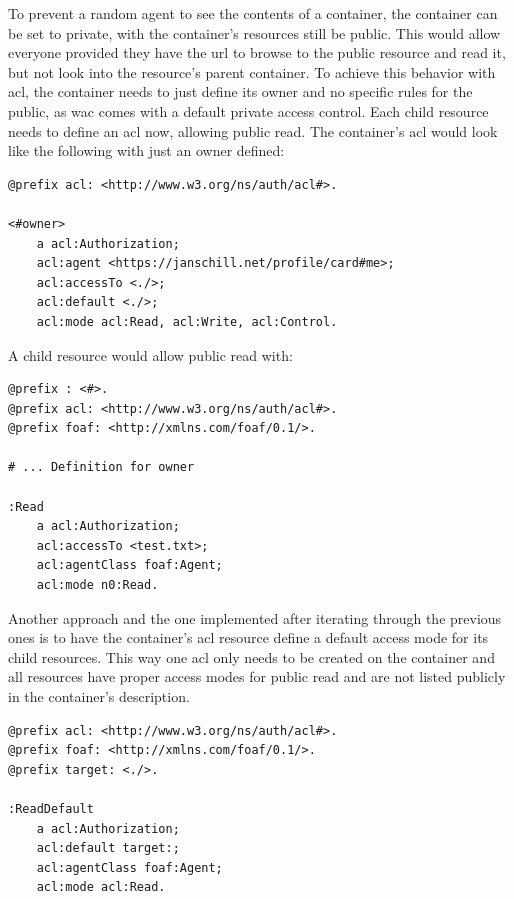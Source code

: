 To prevent a random agent to see the contents of a container, the container can be set to private, with the container’s resources still be public. This would allow everyone provided they have the \gls{url} to browse to the public resource and read it, but not look into the resource’s parent container. To achieve this behavior with \gls{acl}, the container needs to just define its owner and no specific rules for the public, as \gls{wac} comes with a default private access control. Each child resource needs to define an \gls{acl} now, allowing public read.
The container’s \gls{acl} would look like the following with just an owner defined:

\begin{lstlisting}[language=Other,columns=fullflexible, caption={Container \gls{acl} with owner defined.}, label={lst:container-acl-owner}]
@prefix acl: <http://www.w3.org/ns/auth/acl#>.

<#owner>
    a acl:Authorization;
    acl:agent <https://janschill.net/profile/card#me>;
    acl:accessTo <./>;
    acl:default <./>;
    acl:mode acl:Read, acl:Write, acl:Control.
\end{lstlisting}

A child resource would allow public read with:

\begin{lstlisting}[language=Other,columns=fullflexible, caption={Giving read mode to child resources}, label={lst:container-acl-read}]
@prefix : <#>.
@prefix acl: <http://www.w3.org/ns/auth/acl#>.
@prefix foaf: <http://xmlns.com/foaf/0.1/>.

# ... Definition for owner

:Read
    a acl:Authorization;
    acl:accessTo <test.txt>;
    acl:agentClass foaf:Agent;
    acl:mode n0:Read.
\end{lstlisting}

Another approach and the one implemented after iterating through the previous ones is to have the container’s \gls{acl} resource define a default access mode for its child resources. This way one \gls{acl} only needs to be created on the container and all resources have proper access modes for public read and are not listed publicly in the container’s description.

\begin{lstlisting}[language=Other,columns=fullflexible, caption={Giving default read mode to all child resources of container.}, label={lst:container-acl-read-default}]
@prefix acl: <http://www.w3.org/ns/auth/acl#>.
@prefix foaf: <http://xmlns.com/foaf/0.1/>.
@prefix target: <./>.

:ReadDefault
    a acl:Authorization;
    acl:default target:;
    acl:agentClass foaf:Agent;
    acl:mode acl:Read.
\end{lstlisting}
\vspace{0.5cm}

